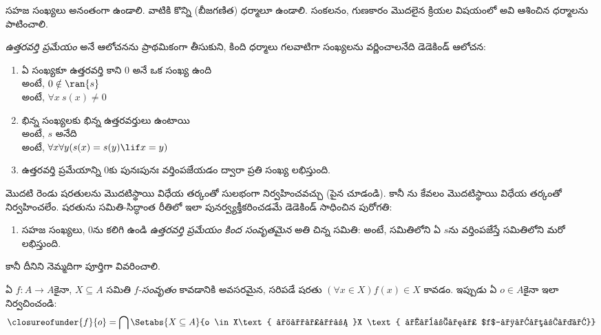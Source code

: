 \documentclass[../../../include/open-logic-section]{subfiles}
\begin{document}

సహజ సంఖ్యలు అనంతంగా ఉండాలి. వాటికి కొన్ని (బీజగణిత)
ధర్మాలూ ఉండాలి. సంకలనం, గుణకారం మొదలైన క్రియల విషయంలో
అవి ఆశించిన ధర్మాలను పాటించాలి.

\emph{ఉత్తరవర్తి ప్రమేయం} అనే ఆలోచనను ప్రాథమికంగా తీసుకుని, కింది
ధర్మాలు గలవాటిగా సంఖ్యలను వర్ణించాలనేది డెడెకిండ్ ఆలోచన:
\begin{enumerate}
	\item ఏ సంఖ్యకూ ఉత్తరవర్తి కాని $0$ అనే ఒక సంఖ్య ఉంది
	\\ అంటే, $0 \notin \ran{s}$
	\\ అంటే, $\forall x\ s(x) \neq 0$
	\item భిన్న సంఖ్యలకు భిన్న ఉత్తరవర్తులు ఉంటాయి
	\\ అంటే, $s$ అనేది 
	\\ అంటే, $\forall x \forall y (s(x) = s(y) \lif x = y)$
	\item{} ఉత్తరవర్తి ప్రమేయాన్ని $0$కు
	పునఃపునః వర్తింపజేయడం ద్వారా ప్రతి సంఖ్య లభిస్తుంది.
\end{enumerate}
మొదటి రెండు షరతులను మొదటిస్థాయి విధేయ తర్కంతో సులభంగా నిర్వహించవచ్చు (పైన
చూడండి). కానీ ను కేవలం మొదటిస్థాయి విధేయ తర్కంతో
నిర్వహించలేం.  షరతును సమితి-సిద్ధాంత
రీతిలో ఇలా పునర్వ్యక్తీకరించడమే డెడెకిండ్ సాధించిన పురోగతి:
\begin{enumerate}
	\item[3$'$.] సహజ సంఖ్యలు, $0$ను కలిగి ఉండి
	\emph{ఉత్తరవర్తి ప్రమేయం కింద సంవృతమైన} అతి చిన్న సమితి: అంటే,
	సమితిలోని ఏ  $s$ను వర్తింపజేస్తే సమితిలోని మరో
	 లభిస్తుంది.
\end{enumerate}
కానీ దీనిని నెమ్మదిగా పూర్తిగా వివరించాలి.

\begin{defn}
	ఏ $f \colon A \to A$కైనా, $X \subseteq A$ సమితి
$f$-\emph{సంవృతం} కావడానికి అవసరమైన, సరిపడే షరతు $(\forall x \in X)f(x) \in X$ కావడం.
ఇప్పుడు ఏ $o \in A$కైనా ఇలా నిర్వచించండి:
	$$\closureofunder{f}{o} = \bigcap\Setabs{X \subseteq A}{o \in X\text{ మరియు }X
\text{ అనేది $f$-సంవృతం}}$$
\end{defn}
\end{document}
